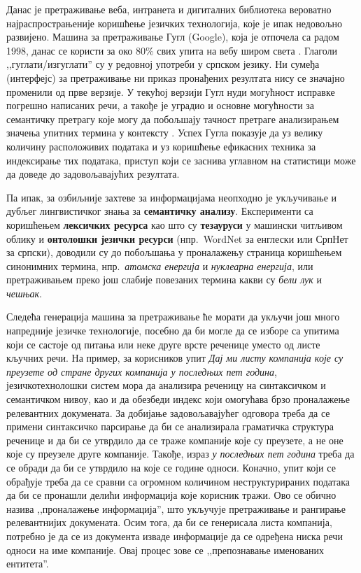 \begin{multicols}{2}
Данас је претраживање веба, интранета и дигиталних библиотека вероватно најраспрострањеније коришћење језичких технологија, које је ипак недовољно развијено. Машина за претраживање Гугл (Google), која је отпочела са радом 1998, данас се користи за око 80\% свих упита на вебу широм света \cite{SPIEGEL}. Глаголи ,,гуглати/изгуглати'' су у редовној употреби у српском језику. Ни сумеђа (интерфејс) за претраживање ни приказ пронађених резултата нису се значајно променили од прве верзије. У текућој верзији Гугл нуди могућност исправке погрешно написаних речи, а такође је уградио и основне могућности за семантичку претрагу које могу да побољшају тачност претраге анализирањем значења упитних термина у контексту \cite{PCWORLD}.  Успех Гугла показује да уз велику количину расположивих података и уз коришћење ефикасних техника за индексирање тих података, приступ који се заснива углавном на статистици може да доведе до задовољавајућих резултата.  

Па ипак, за озбиљније захтеве за информацијама неопходно је укључивање и дубљег лингвистичког знања за \textbf{семантичку анализу}. Експерименти са коришћењем \textbf{лексичких ресурса} као што су \textbf{тезауруси} у машински читљивом облику и \textbf{онтолошки језички ресурси} (нпр.~WordNet за енглески или СрпНет за српски), доводили су до побољшања у проналажењу страница коришћењем синонимних термина, нпр.~\textit{атомска енергија} и \textit{нуклеарна енергија}, или претраживањем преко још слабије повезаних термина какви су \textit{бели лук} и \textit{чешњак}. 


Следећа генерација машина за претраживање ће морати да укључи још много напредније језичке технологије, посебно да би могле да се изборе са упитима који се састоје од питања или неке друге врсте реченице уместо од листе кључних речи. На пример, за корисников упит \textit{Дај ми листу компанија које су преузете од стране других компанија у последњих пет година}, језичкотехнолошки систем мора да анализира реченицу на синтаксичком и семантичком нивоу, као и да обезбеди индекс који омогућава брзо проналажење релевантних докумената. За добијање задовољавајућег одговора треба да се примени синтаксичко парсирање да би се анализирала граматичка структура реченице и да би се утврдило да се траже компаније које су преузете, а не оне које су преузеле друге компаније. Такође, израз \textit{у последњих пет година} треба да се обради да би се утврдило на које се године односи. Коначно, упит који се обрађује треба да се сравни са огромном количином неструктурираних података да би се пронашли делићи информација које корисник тражи. Ово се обично назива ,,проналажење информација'', што укључује претраживање и рангирање релевантнијих докумената. Осим тога, да би се генерисала листа компанија, потребно је да се из документа  изваде информације да се одређена ниска речи односи на име компаније. Овај процес зове се ,,препознавање именованих ентитета''. 


\end{multicols}
